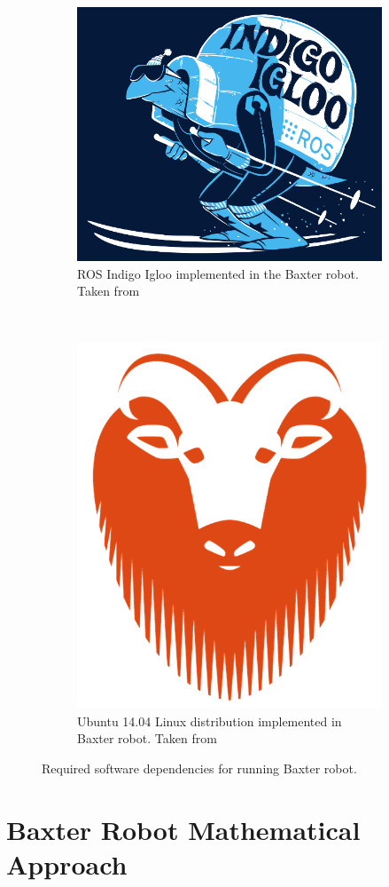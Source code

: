 \documentclass[11pt]{report} %
\begin{document}
\begin{figure}[H]
	\centering
	\begin{subfigure}{.5\textwidth}
		\centering
		\includegraphics[width=0.7\linewidth]{assets/imgs/baxter_robot/ros_indigo.png}
		\caption{ROS Indigo Igloo implemented in the Baxter robot. Taken from \citep{cite_ros_indigo_main_page}}
		\label{fig_ros_indigo_logo}
	\end{subfigure}~
	\begin{subfigure}{.5\textwidth}
		\centering
		\includegraphics[width=0.55\linewidth]{assets/imgs/baxter_robot/ubuntu_logo.jpg}
		\caption{Ubuntu 14.04 Linux distribution implemented in Baxter robot. Taken from \citep{cite_ubuntu_download_1404}}
		\label{fig_ubuntu_1404_logo}
	\end{subfigure}%
	\caption{Required software dependencies for running Baxter robot.}
	\label{fig_required_baxter_software}
\end{figure}


\section{Baxter Robot Mathematical Approach}
\end{document}
